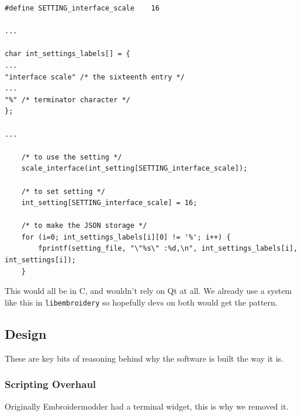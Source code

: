 \documentclass[a4paper, 11pt]{report}
\begin{document}
\begin{verbatim}
#define SETTING_interface_scale    16

...

char int_settings_labels[] = {
...
"interface scale" /* the sixteenth entry */
...
"%" /* terminator character */
};

...

    /* to use the setting */
    scale_interface(int_setting[SETTING_interface_scale]);

    /* to set setting */
    int_setting[SETTING_interface_scale] = 16;

    /* to make the JSON storage */
    for (i=0; int_settings_labels[i][0] != '%'; i++) {
        fprintf(setting_file, "\"%s\" :%d,\n", int_settings_labels[i], int_settings[i]);
    }
\end{verbatim}

This would all be in C, and wouldn't rely on Qt at all. We already use a
system like this in \texttt{libembroidery} so hopefully devs on both
would get the pattern.

\hypertarget{design}{%
\subsection{Design}\label{design}}

These are key bits of reasoning behind why the software is built the way
it is.

\hypertarget{scripting-overhaul}{%
\subsubsection{Scripting Overhaul}\label{scripting-overhaul}}

Originally Embroidermodder had a terminal widget, this is why we removed
it.
\end{document}
